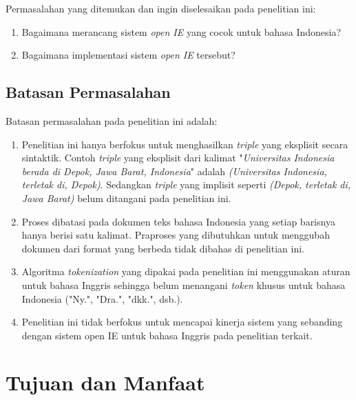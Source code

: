 Permasalahan yang ditemukan dan ingin diselesaikan pada penelitian ini:

\begin{enumerate}
\item Bagaimana merancang sistem \textit{open IE} yang cocok untuk bahasa Indonesia?
\item Bagaimana implementasi sistem \textit{open IE} tersebut?
\end{enumerate}

\subsection{Batasan Permasalahan}

Batasan permasalahan pada penelitian ini adalah:

\begin{enumerate}
\item Penelitian ini hanya berfokus untuk menghasilkan \textit{triple} yang eksplisit secara sintaktik. Contoh \textit{triple} yang eksplisit dari kalimat "\textit{Universitas Indonesia berada di Depok, Jawa Barat, Indonesia}" adalah \textit{(Universitas Indonesia, terletak di, Depok)}. Sedangkan \textit{triple} yang implisit seperti \textit{(Depok, terletak di, Jawa Barat)} belum ditangani pada penelitian ini.

\item Proses dibatasi pada dokumen teks bahasa Indonesia yang setiap barisnya hanya berisi satu kalimat. Praproses yang dibutuhkan untuk menggubah dokumen dari format yang berbeda tidak dibahas di penelitian ini.

\item Algoritma \textit{tokenization} yang dipakai pada penelitian ini menggunakan aturan untuk bahasa Inggris sehingga belum menangani \textit{token} khusus untuk bahasa Indonesia ("Ny.", "Dra.", "dkk.", dsb.).

\item Penelitian ini tidak berfokus untuk mencapai kinerja sistem yang sebanding dengan sistem open IE untuk bahasa Inggris pada penelitian terkait.

\end{enumerate}

\section{Tujuan dan Manfaat}

